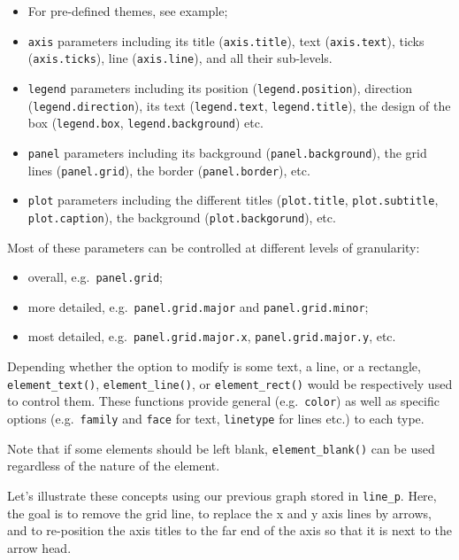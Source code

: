 \documentclass[
]{book}
\providecommand{\tightlist}{%
  \setlength{\itemsep}{0pt}\setlength{\parskip}{0pt}}
\begin{document}
\begin{itemize}
\tightlist
\item
  For pre-defined themes, see example;
\item
  \texttt{axis} parameters including its title (\texttt{axis.title}), text (\texttt{axis.text}), ticks (\texttt{axis.ticks}), line (\texttt{axis.line}), and all their sub-levels.
\item
  \texttt{legend} parameters including its position (\texttt{legend.position}), direction (\texttt{legend.direction}), its text (\texttt{legend.text}, \texttt{legend.title}), the design of the box (\texttt{legend.box}, \texttt{legend.background}) etc.
\item
  \texttt{panel} parameters including its background (\texttt{panel.background}), the grid lines (\texttt{panel.grid}), the border (\texttt{panel.border}), etc.
\item
  \texttt{plot} parameters including the different titles (\texttt{plot.title}, \texttt{plot.subtitle}, \texttt{plot.caption}), the background (\texttt{plot.backgorund}), etc.
\end{itemize}

Most of these parameters can be controlled at different levels of granularity:

\begin{itemize}
\tightlist
\item
  overall, e.g.~\texttt{panel.grid};
\item
  more detailed, e.g.~\texttt{panel.grid.major} and \texttt{panel.grid.minor};
\item
  most detailed, e.g.~\texttt{panel.grid.major.x}, \texttt{panel.grid.major.y}, etc.
\end{itemize}

Depending whether the option to modify is some text, a line, or a rectangle, \texttt{element\_text()}, \texttt{element\_line()}, or \texttt{element\_rect()} would be respectively used to control them. These functions provide general (e.g.~\texttt{color}) as well as specific options (e.g.~\texttt{family} and \texttt{face} for text, \texttt{linetype} for lines etc.) to each type.

Note that if some elements should be left blank, \texttt{element\_blank()} can be used regardless of the nature of the element.

Let's illustrate these concepts using our previous graph stored in \texttt{line\_p}. Here, the goal is to remove the grid line, to replace the x and y axis lines by arrows, and to re-position the axis titles to the far end of the axis so that it is next to the arrow head.
\end{document}
